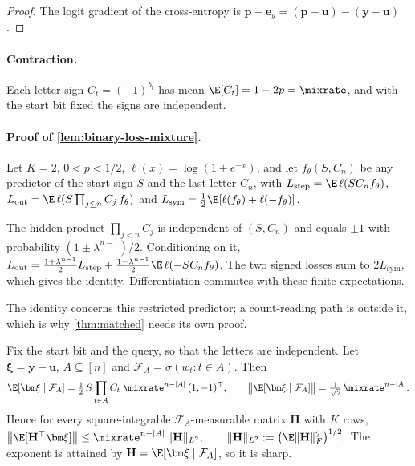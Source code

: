 \begin{proof}
The logit gradient of the cross-entropy is $\bm p-\bm e_y=(\bm p-\bm u)-(\bm y-\bm u)$.
\end{proof}

\paragraph{Contraction.}\label{app:contraction}\label{app:target-spectrum} Each letter sign $C_t=(-1)^{b_t}$ has mean
$\E[C_t]=1-2p=\mixrate$, and with the start bit fixed the signs are independent.

\paragraph{Proof of \cref{lem:binary-loss-mixture}.} Let $K=2$, $0<p<1/2$, $\ell(x)=\log(1+e^{-x})$, and let $f_\theta(S,C_n)$ be
any predictor of the start sign $S$ and the last letter $C_n$, with
$L_{\mathrm{step}}=\E\,\ell(SC_nf_\theta)$, $L_{\mathrm{out}}=\E\,\ell(S\prod_{j\le n}C_j\,f_\theta)$ and
$L_{\mathrm{sym}}=\frac12\E[\ell(f_\theta)+\ell(-f_\theta)]$.

The hidden product $\prod_{j<n}C_j$ is independent of $(S,C_n)$ and equals $\pm1$ with probability
$(1\pm\lambda^{n-1})/2$. Conditioning on it,
$L_{\mathrm{out}}=\frac{1+\lambda^{n-1}}2L_{\mathrm{step}}+\frac{1-\lambda^{n-1}}2\E\,\ell(-SC_nf_\theta)$.
The two signed losses sum to $2L_{\mathrm{sym}}$, which gives the identity. Differentiation commutes with these finite expectations.

The identity concerns this restricted predictor; a count-reading path is outside it, which is why
\cref{thm:matched} needs its own proof.

\begin{lemma}
\label{lem:target-contraction}
Fix the start bit and the query, so that the letters are independent. Let $\bm\xi=\bm y-\bm u$, $A\subseteq[n]$ and
$\mathcal F_A=\sigma(w_t:t\in A)$. Then
\begin{equation}
 \E[\bm\xi\mid\mathcal F_A]=\tfrac12\,S\prod_{t\in A}C_t\;\mixrate^{n-|A|}\,(1,-1)^\top,
 \qquad \bigl\|\E[\bm\xi\mid\mathcal F_A]\bigr\|=\tfrac1{\sqrt2}\,\mixrate^{n-|A|}.
 \label{eq:horizon}
\end{equation}
Hence for every square-integrable $\mathcal F_A$-measurable matrix $\mathbf H$ with $K$ rows,
 $\bigl\|\E[\mathbf H^\top\bm\xi]\bigr\|\le\mixrate^{n-|A|}\,\|\mathbf H\|_{L^2},\qquad \|\mathbf H\|_{L^2}:=\bigl(\E\|\mathbf H\|_F^2\bigr)^{1/2}.$
The exponent is attained by $\mathbf H=\E[\bm\xi\mid\mathcal F_A]$, so it is sharp.
\end{lemma}

